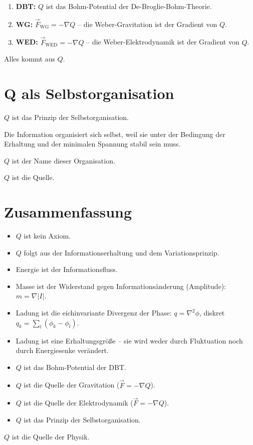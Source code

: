 \begin{enumerate}
\item \textbf{DBT:} \( Q \) ist das Bohm-Potential der De-Broglie-Bohm-Theorie.
\item \textbf{WG:} \( \vec{F}_{\text{WG}} = -\nabla Q \) – die Weber-Gravitation ist der Gradient von \( Q \).
\item \textbf{WED:} \( \vec{F}_{\text{WED}} = -\nabla Q \) – die Weber-Elektrodynamik ist der Gradient von \( Q \).
\end{enumerate}

Alles kommt aus \( Q \).

\section{Q als Selbstorganisation}

\( Q \) ist das Prinzip der Selbstorganisation.

Die Information organisiert sich selbst, weil sie unter der Bedingung der Erhaltung und der minimalen Spannung stabil sein muss.

\( Q \) ist der Name dieser Organisation.

\( Q \) ist die Quelle.

\section{Zusammenfassung}

\begin{itemize}
\item \( Q \) ist kein Axiom.
\item \( Q \) folgt aus der Informationserhaltung und dem Variationsprinzip.
\item Energie ist der Informationsfluss.
\item Masse ist der Widerstand gegen Informationsänderung (Amplitude): \( m = \nabla |I| \).
\item Ladung ist die eichinvariante Divergenz der Phase: \( q = \nabla^2 \phi \), diskret \( q_k = \sum_l (\phi_k - \phi_l) \).
\item Ladung ist eine Erhaltungsgröße – sie wird weder durch Fluktuation noch durch Energiesenke verändert.
\item \( Q \) ist das Bohm-Potential der DBT.
\item \( Q \) ist die Quelle der Gravitation (\( \vec{F} = -\nabla Q \)).
\item \( Q \) ist die Quelle der Elektrodynamik (\( \vec{F} = -\nabla Q \)).
\item \( Q \) ist das Prinzip der Selbstorganisation.
\end{itemize}

\( Q \) ist die Quelle der Physik.